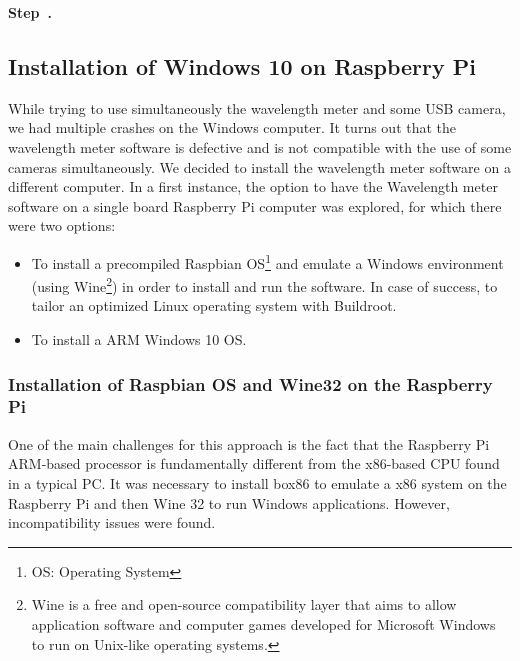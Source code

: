 \documentclass[a4paper,12pt]{article}
\newcounter{step}
\newenvironment{step}[1][]{\refstepcounter{step}\par\medskip
	\textbf{Step~\thestep. #1} \rmfamily }{\medskip}
\begin{document}
\begin{step}
\end{step}

\subsection{Installation of Windows 10 on Raspberry Pi}
\label{section:installation_windows10}
While trying to use simultaneously the wavelength meter and some USB camera, we had multiple crashes on the Windows computer. It turns out that the wavelength meter software is defective and is not compatible with the use of some cameras simultaneously. We decided to install the wavelength meter software on a different computer. In a first instance, the option to have the Wavelength meter software on a single board Raspberry Pi computer was explored, for which there were two options:

\begin{itemize}
\itemsep 0em %
\item To install a precompiled Raspbian OS\footnote{OS: Operating System} and emulate a Windows environment (using Wine\footnote{Wine is a free and open-source compatibility layer that aims to allow application software and computer games developed for Microsoft Windows to run on Unix-like operating systems.}) in order to install and run the software. In case of success, to tailor an optimized Linux operating system with Buildroot.
\item To install a ARM Windows 10 OS.
\end{itemize}

\subsubsection{Installation of Raspbian OS and Wine32 on the Raspberry Pi}

One of the main challenges for this approach is the fact that the Raspberry Pi ARM-based processor is fundamentally different from the x86-based CPU found in a typical PC. It was necessary to install box86 to emulate a x86 system on the Raspberry Pi and then Wine 32 to run Windows applications. However, incompatibility issues were found.\\
\end{document}
